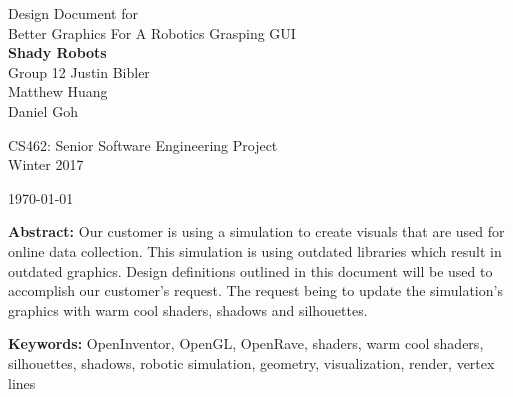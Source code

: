 \documentclass[10pt,journal,compsoc,draftclsnofoot]{IEEEtran}
\begin{document}
\onecolumn

\begin{titlepage}
\null
\vspace{15mm}

\begin{flushleft}
\begin{bfseries}
	\vskip2mm
	\Huge{Design Document for\\ Better Graphics For A Robotics Grasping GUI}\\
	\vspace{15mm}
	\textbf{\huge Shady Robots} \\
	\vskip2mm
	\large{Group 12}
	\vskip5mm
	\Large{Justin Bibler \\
	Matthew Huang \\
	Daniel Goh \\}
\end{bfseries}

\vspace{15mm}
\Large{CS462: Senior Software Engineering Project} \\
\Large{Winter 2017} \\

\vspace{5mm}

\today

\vfill

\begin{normalsize}
{\bf Abstract:}
Our customer is using a simulation to create visuals that are used for online data collection.
This simulation is using outdated libraries which result in outdated graphics.
Design definitions outlined in this document will be used to accomplish our customer's request.
The request being to update the simulation's graphics with warm cool shaders, shadows and silhouettes.

{\bf Keywords:} OpenInventor, OpenGL, OpenRave, shaders, warm cool shaders, silhouettes, shadows, robotic simulation, geometry, visualization, render, vertex lines
\end{normalsize}
\end{flushleft}

\newpage

\end{titlepage}
\end{document}
